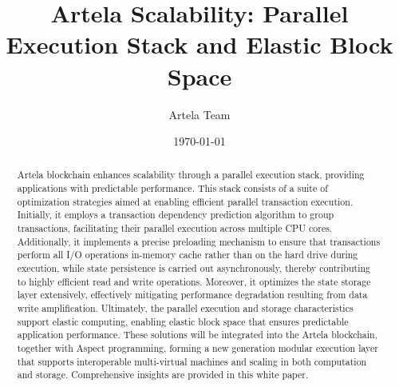 \documentclass[twocolumn]{article}
\begin{document}
\small

\title{Artela Scalability: Parallel Execution Stack and Elastic Block Space}
\author{Artela Team}
\date{\today}


\maketitle

\begin{abstract}
    Artela blockchain enhances scalability through a parallel execution stack, providing applications with predictable performance. This stack consists of a suite of optimization strategies aimed at enabling efficient parallel transaction execution. Initially, it employs a transaction dependency prediction algorithm to group transactions, facilitating their parallel execution across multiple CPU cores. Additionally, it implements a precise preloading mechanism to ensure that transactions perform all I/O operations in-memory cache rather than on the hard drive during execution, while state persistence is carried out asynchronously, thereby contributing to highly efficient read and write operations. Moreover, it optimizes the state storage layer extensively, effectively mitigating performance degradation resulting from data write amplification. Ultimately, the parallel execution and storage characteristics support elastic computing, enabling elastic block space that ensures predictable application performance. These solutions will be integrated into the Artela blockchain, together with Aspect programming\cite{artela_aspect_whitepaper}, forming a new generation modular execution layer that supports interoperable multi-virtual machines and scaling in both computation and storage. Comprehensive insights are provided in this white paper.
\end{abstract}











 
\end{document}
